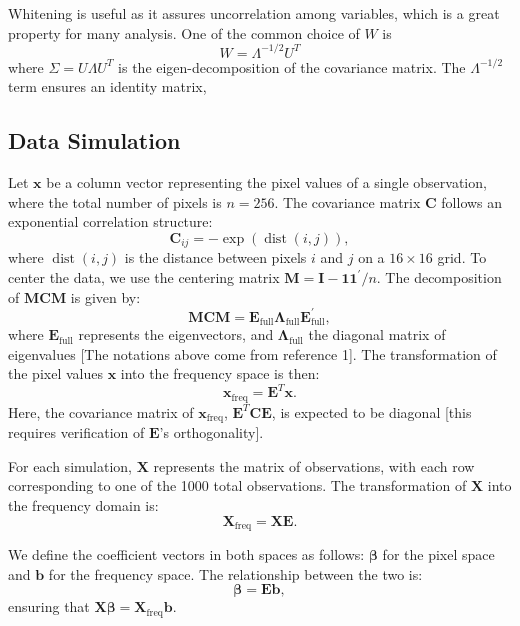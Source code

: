 \documentclass[12pt]{article}
\begin{document}
Whitening is useful as it assures uncorrelation among variables, which is a great property for many analysis. One of the common choice of \( W \) is 
\[
  W = \Lambda^{-1/2} U^T
\]
where \( \Sigma = U \Lambda U^T \) is the eigen-decomposition of the covariance matrix. The \( \Lambda^{-1/2} \) term ensures an identity matrix,

\subsection*{Data Simulation}

Let \( \mathbf{x} \) be a column vector representing the pixel values of a single observation, where the total number of pixels is \( n = 256 \). The covariance matrix \( \mathbf{C} \) follows an exponential correlation structure:
\[
\mathbf{C}_{ij} = -\exp(\operatorname{dist}(i,j)),
\]
where \( \operatorname{dist}(i,j) \) is the distance between pixels \( i \) and \( j \) on a \( 16 \times 16 \) grid. To center the data, we use the centering matrix \( \mathbf{M} = \mathbf{I} - \mathbf{1} \mathbf{1}^{\prime} / n \). The decomposition of \( \mathbf{MCM} \) is given by:
\[
\mathbf{MCM} = \mathbf{E}_{\text{full}} \mathbf{\Lambda}_{\text{full}} \mathbf{E}_{\text{full}}^{\prime},
\]
where \( \mathbf{E}_{\text{full}} \) represents the eigenvectors, and \( \mathbf{\Lambda}_{\text{full}} \) the diagonal matrix of eigenvalues [The notations above come from reference 1]. The transformation of the pixel values \( \mathbf{x} \) into the frequency space is then:
\[
\mathbf{x}_{\text{freq}} = \mathbf{E}^T \mathbf{x}.
\]
Here, the covariance matrix of \( \mathbf{x}_{\text{freq}} \), \( \mathbf{E}^T \mathbf{C} \mathbf{E} \), is expected to be diagonal [this requires verification of \( \mathbf{E} \)'s orthogonality].

For each simulation, \( \mathbf{X} \) represents the matrix of observations, with each row corresponding to one of the 1000 total observations. The transformation of \( \mathbf{X} \) into the frequency domain is:
\[
\mathbf{X}_{\mathrm{freq}} = \mathbf{X} \mathbf{E}.
\]

We define the coefficient vectors in both spaces as follows: \( \boldsymbol{\beta} \) for the pixel space and \( \mathbf{b} \) for the frequency space. The relationship between the two is:
\[
\boldsymbol{\beta} = \mathbf{E} \mathbf{b},
\]
ensuring that \( \mathbf{X} \boldsymbol{\beta} = \mathbf{X}_{\mathrm{freq}} \mathbf{b} \).
\end{document}
